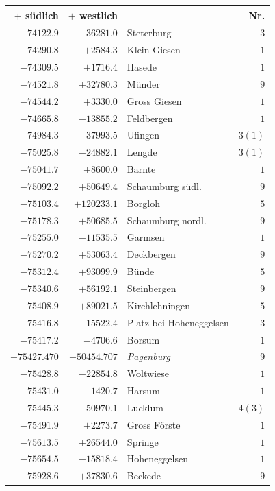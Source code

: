 \clearpage{}%
\begin{center}\begingroup\fontsize{8}{9}\selectfont
\setlength{\tabcolsep}{4pt}
\begin{tabular}{r|r|p{170pt}|r}\hline
\(+\) südlich&\(+\) westlich&&Nr.\\\hline
\(-74122.9\)&\(-36281.0\)&Steterburg&\(3\)\\
\(-74290.8\)&\(+2584.3\)&Klein Giesen&\(1\)\\
\(-74309.5\)&\(+1716.4\)&Hasede&\(1\)\\
\(-74521.8\)&\(+32780.3\)&Münder&\(9\)\\
\(-74544.2\)&\(+3330.0\)&Gross Giesen&\(1\)\\
\(-74665.8\)&\(-13855.2\)&Feldbergen&\(1\)\\
\(-74984.3\)&\(-37993.5\)&Ufingen&\(3 (1)\)\\
\(-75025.8\)&\(-24882.1\)&Lengde&\(3 (1)\)\\
\(-75041.7\)&\(+8600.0\)&Barnte&\(1\)\\
\(-75092.2\)&\(+50649.4\)&Schaumburg südl.&\(9\)\\
\(-75103.4\)&\(+120233.1\)&Borgloh&\(5\)\\
\(-75178.3\)&\(+50685.5\)&Schaumburg nordl.&\(9\)\\
\(-75255.0\)&\(-11535.5\)&Garmsen&\(1\)\\
\(-75270.2\)&\(+53063.4\)&Deckbergen&\(9\)\\
\(-75312.4\)&\(+93099.9\)&Bünde&\(5\)\\
\(-75340.6\)&\(+56192.1\)&Steinbergen&\(9\)\\
\(-75408.9\)&\(+89021.5\)&Kirchlehningen&\(5\)\\
\(-75416.8\)&\(-15522.4\)&Platz bei Hoheneggelsen&\(3\)\\
\(-75417.2\)&\(-4706.6\)&Borsum&\(1\)\\
\(-75427.470\)&\(+50454.707\)&\textit{Pagenburg}&\(9\)\\
\(-75428.8\)&\(-22854.8\)&Woltwiese&\(1\)\\
\(-75431.0\)&\(-1420.7\)&Harsum&\(1\)\\
\(-75445.3\)&\(-50970.1\)&Lucklum&\(4 (3)\)\\
\(-75491.9\)&\(+2273.7\)&Gross Förste&\(1\)\\
\(-75613.5\)&\(+26544.0\)&Springe&\(1\)\\
\(-75654.5\)&\(-15818.4\)&Hoheneggelsen&\(1\)\\
\(-75928.6\)&\(+37830.6\)&Beckede&\(9\)\\

\end{tabular}
\end{center}
